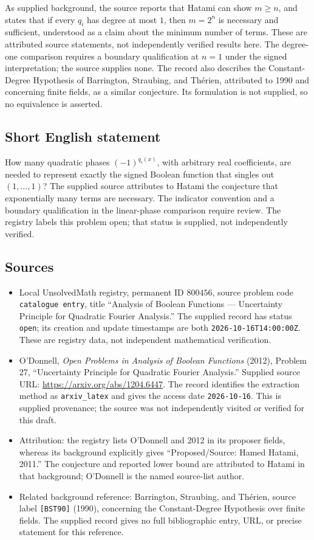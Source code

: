 \documentclass[11pt]{article}
\begin{document}
As supplied background, the source reports that Hatami can show \(m\geq n\), and states that if every \(q_i\) has degree at most \(1\), then \(m=2^n\) is necessary and sufficient, understood as a claim about the minimum number of terms. These are attributed source statements, not independently verified results here. The degree-one comparison requires a boundary qualification at \(n=1\) under the signed interpretation; the source supplies none. The record also describes the Constant-Degree Hypothesis of Barrington, Straubing, and Th\'{e}rien, attributed to 1990 and concerning finite fields, as a similar conjecture. Its formulation is not supplied, so no equivalence is asserted.
\subsection{Short English statement}
How many quadratic phases \((-1)^{q_i(x)}\), with arbitrary real coefficients, are needed to represent exactly the signed Boolean function that singles out \((1,\ldots,1)\)? The supplied source attributes to Hatami the conjecture that exponentially many terms are necessary. The indicator convention and a boundary qualification in the linear-phase comparison require review. The registry labels this problem open; that status is supplied, not independently verified.
\subsection{Sources}
\begin{itemize}
\item Local UnsolvedMath registry, permanent ID \(800456\), source problem code \texttt{catalogue entry}, title ``Analysis of Boolean Functions --- Uncertainty Principle for Quadratic Fourier Analysis.'' The supplied record has status \texttt{open}; its creation and update timestamps are both \texttt{2026-10-16T14:00:00Z}. These are registry data, not independent mathematical verification.
\item O'Donnell, \emph{Open Problems in Analysis of Boolean Functions} (2012), Problem 27, ``Uncertainty Principle for Quadratic Fourier Analysis.'' Supplied source URL: \url{https://arxiv.org/abs/1204.6447}. The record identifies the extraction method as \texttt{arxiv\_latex} and gives the access date \texttt{2026-10-16}. This is supplied provenance; the source was not independently visited or verified for this draft.
\item Attribution: the registry lists O'Donnell and 2012 in its proposer fields, whereas its background explicitly gives ``Proposed/Source: Hamed Hatami, 2011.'' The conjecture and reported lower bound are attributed to Hatami in that background; O'Donnell is the named source-list author.
\item Related background reference: Barrington, Straubing, and Th\'{e}rien, source label \texttt{[BST90]} (1990), concerning the Constant-Degree Hypothesis over finite fields. The supplied record gives no full bibliographic entry, URL, or precise statement for this reference.
\end{itemize}
\end{document}
